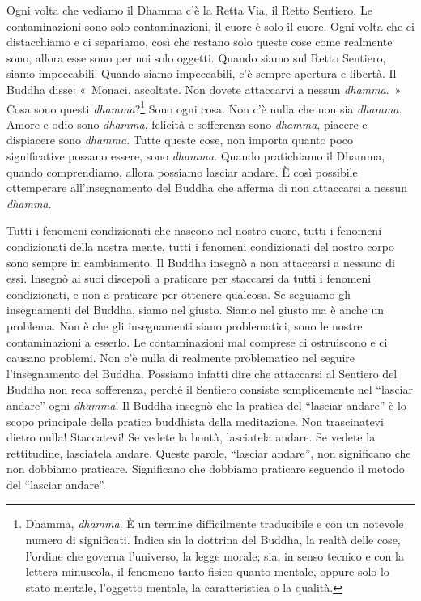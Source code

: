 Ogni volta che vediamo il Dhamma c'è la Retta Via, il Retto Sentiero. Le
contaminazioni sono solo contaminazioni, il cuore è solo il cuore. Ogni
volta che ci distacchiamo e ci separiamo, così che restano solo queste
cose come realmente sono, allora esse sono per noi solo oggetti. Quando
siamo sul Retto Sentiero, siamo impeccabili. Quando siamo impeccabili,
c'è sempre apertura e libertà. Il Buddha disse: «~Monaci, ascoltate. Non
dovete attaccarvi a nessun \emph{dhamma}.~» Cosa sono questi
\emph{dhamma}?\footnote{Dhamma, \emph{dhamma}. È un termine
  difficilmente traducibile e con un notevole numero di significati.
  Indica sia la dottrina del Buddha, la realtà delle cose, l'ordine che
  governa l'universo, la legge morale; sia, in senso tecnico e con la
  lettera minuscola, il fenomeno tanto fisico quanto mentale, oppure
  solo lo stato mentale, l'oggetto mentale, la caratteristica o la
  qualità.} Sono ogni cosa. Non c'è nulla che non sia \emph{dhamma}.
Amore e odio sono \emph{dhamma}, felicità e sofferenza sono
\emph{dhamma}, piacere e dispiacere sono \emph{dhamma}. Tutte queste
cose, non importa quanto poco significative possano essere, sono
\emph{dhamma}. Quando pratichiamo il Dhamma, quando comprendiamo, allora
possiamo lasciar andare. È così possibile ottemperare all'insegnamento
del Buddha che afferma di non attaccarsi a nessun \emph{dhamma}.

Tutti i fenomeni condizionati che nascono nel nostro cuore, tutti i
fenomeni condizionati della nostra mente, tutti i fenomeni condizionati
del nostro corpo sono sempre in cambiamento. Il Buddha insegnò a non
attaccarsi a nessuno di essi. Insegnò ai suoi discepoli a praticare per
staccarsi da tutti i fenomeni condizionati, e non a praticare per
ottenere qualcosa. Se seguiamo gli insegnamenti del Buddha, siamo nel
giusto. Siamo nel giusto ma è anche un problema. Non è che gli
insegnamenti siano problematici, sono le nostre contaminazioni a
esserlo. Le contaminazioni mal comprese ci ostruiscono e ci causano
problemi. Non c'è nulla di realmente problematico nel seguire
l'insegnamento del Buddha. Possiamo infatti dire che attaccarsi al
Sentiero del Buddha non reca sofferenza, perché il Sentiero consiste
semplicemente nel ``lasciar andare'' ogni \emph{dhamma}! Il Buddha
insegnò che la pratica del ``lasciar andare'' è lo scopo principale
della pratica buddhista della meditazione. Non trascinatevi dietro
nulla! Staccatevi! Se vedete la bontà, lasciatela andare. Se vedete la
rettitudine, lasciatela andare. Queste parole, ``lasciar andare'', non
significano che non dobbiamo praticare. Significano che dobbiamo
praticare seguendo il metodo del ``lasciar andare''.

